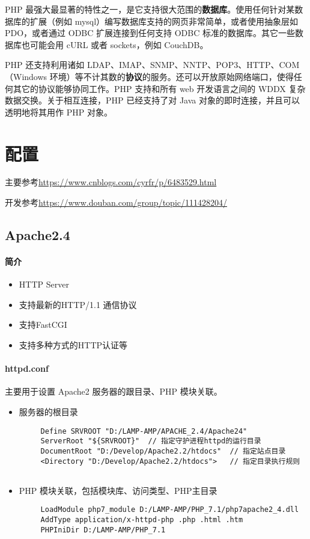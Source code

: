 \documentclass[UTF8,a4paper,12pt]{ctexbook}
\begin{document}
 		PHP 最强大最显著的特性之一，是它支持很大范围的\textbf{数据库}。使用任何针对某数据库的扩展（例如 mysql）编写数据库支持的网页非常简单，或者使用抽象层如 PDO，或者通过 ODBC 扩展连接到任何支持 ODBC 标准的数据库。其它一些数据库也可能会用 cURL 或者 sockets，例如 CouchDB。
 		
 		PHP 还支持利用诸如 LDAP、IMAP、SNMP、NNTP、POP3、HTTP、COM（Windows 环境）等不计其数的\textbf{协议}的服务。还可以开放原始网络端口，使得任何其它的协议能够协同工作。PHP 支持和所有 web 开发语言之间的 WDDX 复杂数据交换。关于相互连接，PHP 已经支持了对 Java 对象的即时连接，并且可以透明地将其用作 PHP 对象。
 	
 	
 	\section{配置}
 		主要参考\url{https://www.cnblogs.com/cyrfr/p/6483529.html}
 		
 		开发参考\url{https://www.douban.com/group/topic/111428204/}
 		\subsection{Apache2.4}
 			\paragraph{简介}
 				\begin{itemize}
 					\item HTTP Server
 					\item 支持最新的HTTP/1.1 通信协议
 					\item 支持FastCGI
 					\item 支持多种方式的HTTP认证等
 				\end{itemize}
	 		\paragraph{httpd.conf}
	 			主要用于设置 Apache2 服务器的跟目录、PHP 模块关联。
	 			\begin{itemize}
	 				\item 服务器的根目录 
	 					\begin{lstlisting}
	 Define SRVROOT "D:/LAMP-AMP/APACHE_2.4/Apache24"
	 ServerRoot "${SRVROOT}"  // 指定守护进程httpd的运行目录
	 DocumentRoot "D:/Develop/Apache2.2/htdocs"  // 指定站点目录
	 <Directory "D:/Develop/Apache2.2/htdocs">   // 指定目录执行规则
	 
	 					\end{lstlisting}
	 					
	 				\item PHP 模块关联，包括模块库、访问类型、PHP主目录
	 					\begin{lstlisting}
	 LoadModule php7_module D:/LAMP-AMP/PHP_7.1/php7apache2_4.dll  
	 AddType application/x-httpd-php .php .html .htm
	 PHPIniDir D:/LAMP-AMP/PHP_7.1
	 					\end{lstlisting}
	 			\end{itemize}
	 			
\end{document}
